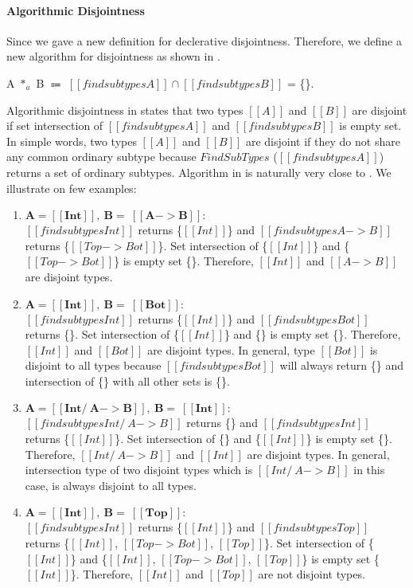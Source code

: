 \paragraph{Algorithmic Disjointness}
Since we gave a new definition for declerative disjointness.
Therefore, we define a new algorithm for disjointness as shown in .

\begin{definition}
\label{def:inter:ad}
  A $*_a$ B $\Coloneqq$  $ [[findsubtypes A]] \cap [[findsubtypes B]] $ = \{\}.
\end{definition} 

\noindent Algorithmic disjointness in  states that two types $[[A]]$ and $[[B]]$ 
are disjoint
if set intersection of $[[findsubtypes A]]$ and $[[findsubtypes B]]$ is empty set. In simple words,
two types $[[A]]$ and $[[B]]$ are disjoint if they do not share any common ordinary subtype because 
$FindSubTypes$ ($[[findsubtypes A]]$) returns a set of ordinary subtypes. Algorithm in 
is naturally very close to . We illustrate  on few examples:

\begin{enumerate}
  \item $\boldsymbol{A = [[Int]], \ B = \ [[A -> B]]:}$ \\
        $[[findsubtypes Int]]$ returns \{$[[Int]]$\} and $[[findsubtypes A -> B]]$ returns
        \{$[[Top -> Bot]]$\}. Set intersection of \{$[[Int]]$\} and \{$[[Top -> Bot]]$\} is
        empty set \{\}. Therefore, $[[Int]]$ and $[[A -> B]]$ are disjoint types.
  \item $\boldsymbol{A = [[Int]], \ B = \ [[Bot]]:}$ \\
        $[[findsubtypes Int]]$ returns \{$[[Int]]$\} and $[[findsubtypes Bot]]$ returns
        \{\}. Set intersection of \{$[[Int]]$\} and \{\} is
        empty set \{\}. Therefore, $[[Int]]$ and $[[Bot]]$ are disjoint types.
        In general, type $[[Bot]]$ is disjoint to all types because $[[findsubtypes Bot]]$
        will always return \{\} and intersection of \{\} with all other sets is \{\}.
  \item $\boldsymbol{A = [[Int /\ A -> B]], \ B = \ [[Int]]:}$ \\
        $[[findsubtypes Int /\ A -> B]]$ returns \{\} and $[[findsubtypes Int]]$ returns
        \{$[[Int]]$\}. Set intersection of \{\} and \{$[[Int]]$\} is
        empty set \{\}. Therefore, $[[Int /\ A -> B]]$ and $[[Int]]$ are disjoint types.
        In general, intersection type of two disjoint types which is $[[Int /\ A -> B]]$ in this case,
        is always disjoint to all types.
  \item $\boldsymbol{A = [[Int]], \ B = \ [[Top]]:}$ \\
        $[[findsubtypes Int]]$ returns \{$[[Int]]$\} and $[[findsubtypes Top]]$ returns
        \{$[[Int]]$, $[[Top -> Bot]]$, $[[Top]]$\}. 
        Set intersection of \{$[[Int]]$\} and \{$[[Int]]$, $[[Top -> Bot]]$, $[[Top]]$\} is
        empty set \{$[[Int]]$\}. Therefore, $[[Int]]$ and $[[Top]]$ are not disjoint types.
\end{enumerate}

